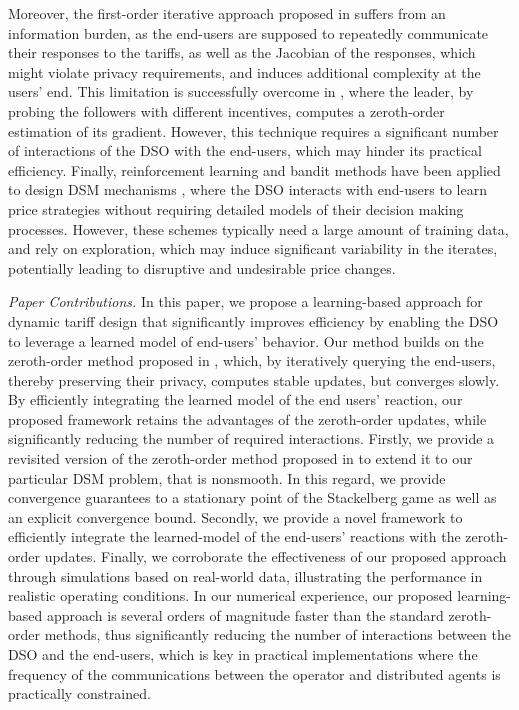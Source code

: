 \documentclass[letterpaper, 10 pt, conference]{ieeeconf}
\begin{document}
Moreover, the first-order iterative approach proposed in \cite{grontas2024big} suffers from an information burden, as the end-users are supposed to repeatedly communicate their responses to the tariffs, as well as the Jacobian of the responses, which might violate privacy requirements, and induces additional complexity at the users' end. This limitation is successfully overcome in \cite{maheshwari2024follower}, where the leader, by probing the followers with different incentives, computes a zeroth-order estimation of its gradient. However, this technique requires a significant number of interactions of the DSO with the end-users, which may hinder its practical efficiency. Finally, reinforcement learning and bandit methods have been applied to design DSM mechanisms \cite{hutchinson2024safe, lu2018dynamic}, where the DSO interacts with end-users to learn price strategies without requiring detailed models of their decision making processes. However, these schemes typically need a large amount of training data, and rely on exploration, which may induce significant variability in the iterates, potentially leading to disruptive and undesirable price changes. 

\smallskip
\noindent
\emph{Paper Contributions.}
In this paper, we propose a learning-based approach for dynamic tariff design that significantly improves efficiency by enabling the DSO to leverage a learned model of end-users' behavior. Our method builds on the zeroth-order method proposed in \cite{maheshwari2024follower}, which, by iteratively querying the end-users, thereby preserving their privacy, computes stable updates, but converges slowly. By efficiently integrating the learned model of the end users' reaction, our proposed framework retains the advantages of the zeroth-order updates, while significantly reducing the number of required interactions. Firstly, we provide a revisited version of the zeroth-order method proposed in \cite{maheshwari2024follower} to extend it to our particular DSM problem, that is nonsmooth. In this regard, we provide convergence guarantees to a stationary point of the Stackelberg game as well as an explicit convergence bound. Secondly, we provide a novel framework to efficiently integrate the learned-model of the end-users' reactions with the zeroth-order updates. Finally, we corroborate the effectiveness of our proposed approach through simulations based on real-world data, illustrating the performance in realistic operating conditions. In our numerical experience, our proposed learning-based approach is several orders of magnitude faster than the standard zeroth-order methods, thus significantly reducing the number of interactions between the DSO and the end-users, which is key in practical implementations where the frequency of the communications between the operator and distributed agents is practically constrained.
\end{document}

